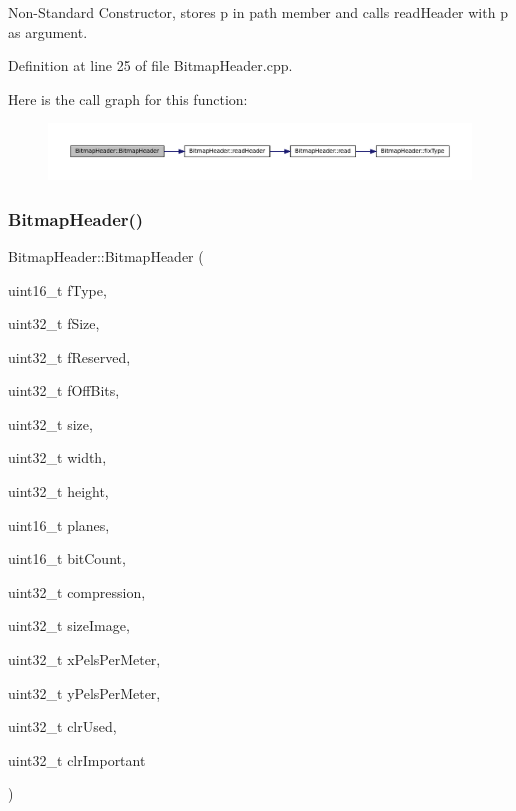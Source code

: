 Non-\/\+Standard Constructor, stores p in path member and calls read\+Header with p as argument. 



Definition at line 25 of file Bitmap\+Header.\+cpp.

Here is the call graph for this function\+:
\nopagebreak
\begin{figure}[H]
\begin{center}
\leavevmode
\includegraphics[width=350pt]{classBitmapHeader_a47ccc09b3e744ecc81588b034718e21a_cgraph}
\end{center}
\end{figure}
\mbox{\label{classBitmapHeader_a2ed96916f44d7b46b0ce7d05cd03cf7d}} 
\subsubsection{\texorpdfstring{BitmapHeader()}{BitmapHeader()}\hspace{0.1cm}{\footnotesize\ttfamily [3/4]}}
{\footnotesize\ttfamily Bitmap\+Header\+::\+Bitmap\+Header (\begin{DoxyParamCaption}\item[{uint16\+\_\+t}]{f\+Type,  }\item[{uint32\+\_\+t}]{f\+Size,  }\item[{uint32\+\_\+t}]{f\+Reserved,  }\item[{uint32\+\_\+t}]{f\+Off\+Bits,  }\item[{uint32\+\_\+t}]{size,  }\item[{uint32\+\_\+t}]{width,  }\item[{uint32\+\_\+t}]{height,  }\item[{uint16\+\_\+t}]{planes,  }\item[{uint16\+\_\+t}]{bit\+Count,  }\item[{uint32\+\_\+t}]{compression,  }\item[{uint32\+\_\+t}]{size\+Image,  }\item[{uint32\+\_\+t}]{x\+Pels\+Per\+Meter,  }\item[{uint32\+\_\+t}]{y\+Pels\+Per\+Meter,  }\item[{uint32\+\_\+t}]{clr\+Used,  }\item[{uint32\+\_\+t}]{clr\+Important }\end{DoxyParamCaption})}



